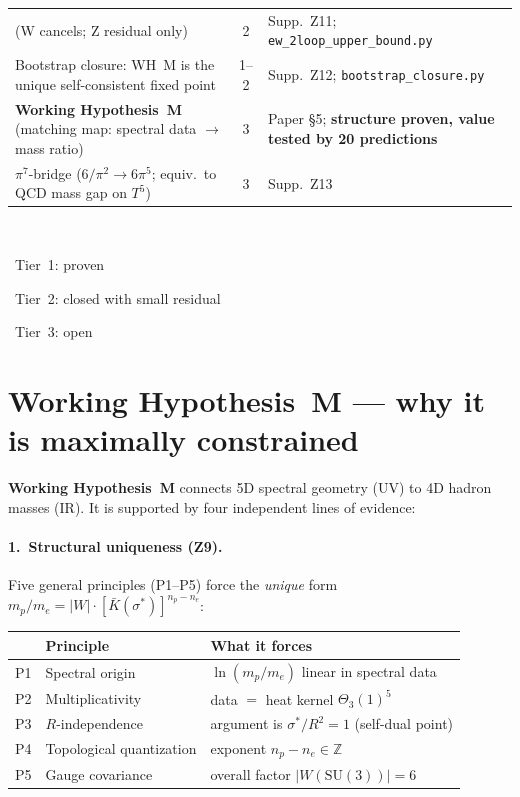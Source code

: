 \documentclass[11pt,a4paper]{article}
\begin{document}
\begin{center}
\begin{tabular}{>{\raggedright}p{5.5cm}cp{5.5cm}}
  (W cancels; Z residual only)
  & 2 & Supp.\ Z11; \texttt{ew\_2loop\_upper\_bound.py}\\
\rowcolor{tier2}
Bootstrap closure: WH~M is the unique self-consistent fixed point
  & 1--2 & Supp.\ Z12; \texttt{bootstrap\_closure.py}\\
\midrule
\rowcolor{tier3}
\textbf{Working Hypothesis~M} (matching map: spectral data $\to$ mass ratio)
  & 3 & Paper \S 5; \textbf{structure proven, value tested by 20 predictions}\\
\rowcolor{tier3}
$\pi^7$-bridge ($6/\pi^2\to 6\pi^5$; equiv.\ to QCD mass gap on $T^5$)
  & 3 & Supp.\ Z13\\
\bottomrule
\end{tabular}\\[0.5em]
\colorbox{tier1}{\strut\small\ Tier~1: proven\ }\quad
\colorbox{tier2}{\strut\small\ Tier~2: closed with small residual\ }\quad
\colorbox{tier3}{\strut\small\ Tier~3: open\ }
\end{center}

\section*{Working Hypothesis~M --- why it is maximally constrained}

\textbf{Working Hypothesis~M} connects 5D spectral geometry (UV) to 4D hadron masses (IR).
It is supported by four independent lines of evidence:

\paragraph{1.\ Structural uniqueness (Z9).}
Five general principles (P1--P5) force the \emph{unique} form
$m_p/m_e = |W|\cdot[\bar K(\sigma^*)]^{n_p-n_e}$:

\begin{center}
\renewcommand{\arraystretch}{1.15}\small
\begin{tabular}{clp{6.8cm}}
\toprule
& \textbf{Principle} & \textbf{What it forces}\\
\midrule
P1 & Spectral origin & $\ln(m_p/m_e)$ linear in spectral data\\
P2 & Multiplicativity & data $=$ heat kernel $\Theta_3(1)^5$\\
P3 & $R$-independence & argument is $\sigma^*/R^2=1$ (self-dual point)\\
P4 & Topological quantization & exponent $n_p-n_e\in\mathbb{Z}$\\
P5 & Gauge covariance & overall factor $|W(\mathrm{SU}(3))|=6$\\
\bottomrule
\end{tabular}
\end{center}
\end{document}
